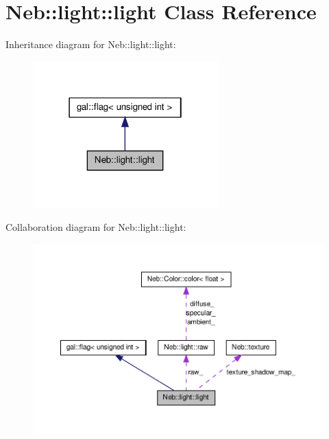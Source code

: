 \hypertarget{classNeb_1_1light_1_1light}{\section{\-Neb\-:\-:light\-:\-:light \-Class \-Reference}
\label{classNeb_1_1light_1_1light}
}


\-Inheritance diagram for \-Neb\-:\-:light\-:\-:light\-:\nopagebreak
\begin{figure}[H]
\begin{center}
\leavevmode
\includegraphics[width=202pt]{classNeb_1_1light_1_1light__inherit__graph}
\end{center}
\end{figure}


\-Collaboration diagram for \-Neb\-:\-:light\-:\-:light\-:\nopagebreak
\begin{figure}[H]
\begin{center}
\leavevmode
\includegraphics[width=350pt]{classNeb_1_1light_1_1light__coll__graph}
\end{center}
\end{figure}
